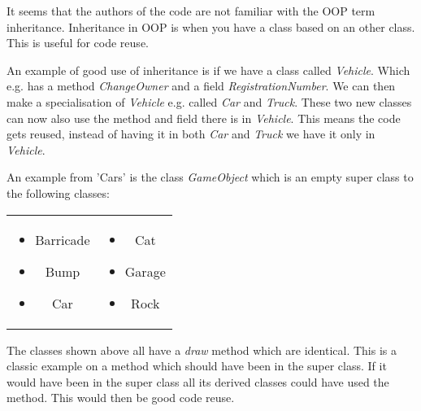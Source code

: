\label{sprint1_inheritance}
It seems that the authors of the code are not familiar with the OOP term inheritance.
Inheritance in OOP is when you have a class based on an other class.
This is useful for code reuse.

An example of good use of inheritance is if we have a class called \textit{Vehicle}.
Which e.g. has a method \textit{ChangeOwner} and a field \textit{RegistrationNumber}.
We can then make a specialisation of \textit{Vehicle} e.g. called \textit{Car} and \textit{Truck}.
These two new classes can now also use the method and field there is in \textit{Vehicle}.
This means the code gets reused, instead of having it in both \textit{Car} and \textit{Truck} we have it only in \textit{Vehicle}.

An example from 'Cars' is the class \textit{GameObject} which is an empty super class to the following classes:

\begin{tabular}{ c  c }
\parbox{\textwidth/2}{
\begin{itemize}
\item Barricade
\item Bump
\item Car
\end{itemize}} &
\parbox{\textwidth/2}{
\begin{itemize}
\item Cat
\item Garage
\item Rock
\end{itemize}
}
\end{tabular}
The classes shown above all have a \textit{draw} method which are identical.
This is a classic example on a method which should have been in the super class.
If it would have been in the super class all its derived classes could have used the method.
This would then be good code reuse.